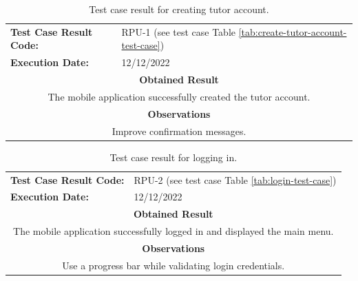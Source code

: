 \documentclass[a4paper,fleqn]{cas-sc}
\begin{document}
			\begin{table}[hbt!]
				\centering
				\caption{Test case result for creating tutor account.}
				\label{tab:create-tutor-account-result}
				\begin{tabularx}{\textwidth}{l X}
					\toprule
					\textbf{Test Case Result Code:} & RPU-1 (see test case Table \ref{tab:create-tutor-account-test-case}) \\
					\textbf{Execution Date:} & 12/12/2022 \\
					\midrule
					\multicolumn{2}{c}{\textbf{Obtained Result}} \\
					\midrule
					\multicolumn{2}{c}{The mobile application successfully created the tutor account.} \\
					\midrule
					\multicolumn{2}{c}{\textbf{Observations}} \\
					\midrule
					\multicolumn{2}{c}{Improve confirmation messages.} \\
					\bottomrule
				\end{tabularx}
			\end{table}
			
			\begin{table}[hbt!]
				\centering
				\caption{Test case result for logging in.}
				\label{tab:login-result}
				\begin{tabularx}{\textwidth}{l X}
					\toprule
					\textbf{Test Case Result Code:} & RPU-2 (see test case Table \ref{tab:login-test-case}) \\
					\textbf{Execution Date:} & 12/12/2022 \\
					\midrule
					\multicolumn{2}{c}{\textbf{Obtained Result}} \\
					\midrule
					\multicolumn{2}{c}{The mobile application successfully logged in and displayed the main menu.} \\
					\midrule
					\multicolumn{2}{c}{\textbf{Observations}} \\
					\midrule
					\multicolumn{2}{c}{Use a progress bar while validating login credentials.} \\
					\bottomrule
				\end{tabularx}
			\end{table}
			
\end{document}
